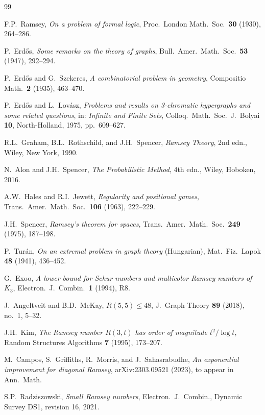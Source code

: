 \documentclass[12pt,a4paper]{amsart}
\theoremstyle{definition}
\theoremstyle{remark}
\begin{document}
\begin{thebibliography}{99}

F.P.~Ramsey,
\textit{On a problem of formal logic},
Proc.\ London Math.\ Soc.\ \textbf{30} (1930), 264--286.

P.~Erd\H{o}s,
\textit{Some remarks on the theory of graphs},
Bull.\ Amer.\ Math.\ Soc.\ \textbf{53} (1947), 292--294.

P.~Erd\H{o}s and G.~Szekeres,
\textit{A combinatorial problem in geometry},
Compositio Math.\ \textbf{2} (1935), 463--470.

P.~Erd\H{o}s and L.~Lov\'asz,
\textit{Problems and results on 3-chromatic hypergraphs and some related questions},
in: \textit{Infinite and Finite Sets}, Colloq.\ Math.\ Soc.\ J.\ Bolyai \textbf{10},
North-Holland, 1975, pp.~609--627.

R.L.~Graham, B.L.~Rothschild, and J.H.~Spencer,
\textit{Ramsey Theory}, 2nd edn., Wiley, New York, 1990.

N.~Alon and J.H.~Spencer,
\textit{The Probabilistic Method}, 4th edn., Wiley, Hoboken, 2016.

A.W.~Hales and R.I.~Jewett,
\textit{Regularity and positional games},
Trans.\ Amer.\ Math.\ Soc.\ \textbf{106} (1963), 222--229.

J.H.~Spencer,
\textit{Ramsey's theorem for spaces},
Trans.\ Amer.\ Math.\ Soc.\ \textbf{249} (1975), 187--198.

P.~Tur\'an,
\textit{On an extremal problem in graph theory} (Hungarian),
Mat.\ Fiz.\ Lapok \textbf{48} (1941), 436--452.

G.~Exoo,
\textit{A lower bound for Schur numbers and multicolor Ramsey numbers of $K_3$},
Electron.\ J.\ Combin.\ \textbf{1} (1994), R8.

J.~Angeltveit and B.D.~McKay,
\textit{$R(5,5) \le 48$},
J.\ Graph Theory \textbf{89} (2018), no.~1, 5--32.

J.H.~Kim,
\textit{The Ramsey number $R(3,t)$ has order of magnitude $t^2/\log t$},
Random Structures Algorithms \textbf{7} (1995), 173--207.

M.~Campos, S.~Griffiths, R.~Morris, and J.~Sahasrabudhe,
\textit{An exponential improvement for diagonal Ramsey},
arXiv:2303.09521 (2023), to appear in Ann.\ Math.

S.P.~Radziszowski,
\textit{Small Ramsey numbers},
Electron.\ J.\ Combin., Dynamic Survey DS1, revision 16, 2021.

\end{thebibliography}
\end{document}
